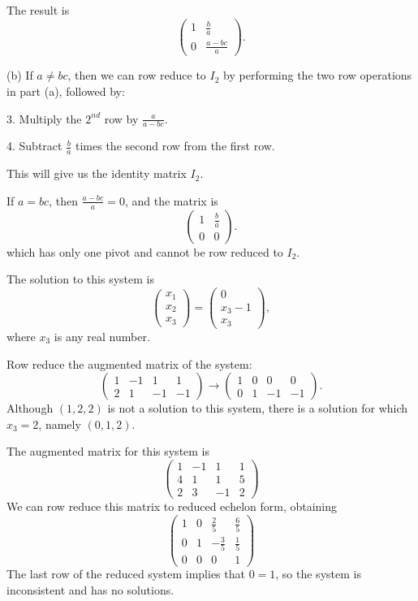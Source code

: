 \documentclass{ximera}
\begin{document}
The result is
\[
\left(\begin{array}{cc} 1 & \frac{b}{a} \\ 0 & \frac{a - bc}{a}\end{array}
\right).
\]

(b) If $a \neq bc$, then we can row reduce  to $I_2$ by
performing the two row operations in part (a), followed by:

3. Multiply the $2^{nd}$ row by $\frac{a}{a - bc}$.

4. Subtract $\frac{b}{a}$ times the second row from the first row.

This will give us the identity matrix $I_2$.

\para If $a = bc$, then $\frac{a - bc}{a} = 0$, and the matrix is
\[
\left(\begin{array}{cc} 1 & \frac{b}{a} \\ 0 & 0\end{array} \right).
\]
which has only one pivot and cannot be row reduced to $I_2$.

\ans The solution to this system is
\[
\left(\begin{array}{c} x_1 \\ x_2 \\ x_3\end{array}\right) =
\left(\begin{array}{c} 0 \\ x_3 - 1 \\ x_3\end{array}\right),
\]
where $x_3$ is any real number.

\soln Row reduce the augmented matrix of the system:
\[
\left(\begin{array}{rrr|r} 1 & -1 & 1 & 1 \\ 2 & 1 & -1 & -1\end{array}\right)
\longrightarrow
\left(\begin{array}{rrr|r} 1 & 0 & 0 & 0 \\ 0 & 1 & -1 & -1\end{array}\right).
\]
Although $(1,2,2)$ is not a solution to this system, there is a solution
for which $x_3 = 2$, namely $(0,1,2)$.

 The augmented matrix for this system is
\[
\left(\begin{array}{rrr|r} 1 & -1 & 1 & 1 \\ 4 & 1 & 1 & 5 \\
2 & 3 & -1 & 2\end{array}\right)
\]
We can row reduce this matrix to reduced echelon form, obtaining
\[
\left(\begin{array}{rrr|r} 1 & 0 & \frac{2}{5} & \frac{6}{5} \\
0 & 1 & -\frac{3}{5} & \frac{1}{5} \\ 0 & 0 & 0 & 1\end{array}\right)
\]
The last row of the reduced system implies that $0 = 1$, so the system
is inconsistent and has no solutions.
\end{document}
